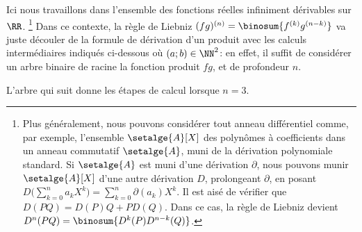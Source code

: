 Ici nous travaillons dans l'ensemble des fonctions réelles infiniment dérivables sur $\RR$.%
\footnote{
	Plus généralement, nous pouvons considérer tout anneau différentiel comme, par exemple, l'ensemble $\setalge{A}[X]$ des polynômes à coefficients dans un anneau commutatif $\setalge{A}$, muni de la dérivation polynomiale standard.
	Si $\setalge{A}$ est muni d'une dérivation $\partial$,
	nous pouvons munir $\setalge{A}[X]$ d'une autre dérivation $D$, prolongeant $\partial$, en posant
	$D \big( \sum_{k=0}^n a_k X^k \big) = \sum_{k=0}^n \partial(a_k) X^k$.
	Il est aisé de vérifier que $D(PQ) = D(P) Q + P D(Q)$.
	Dans ce cas, la règle de Liebniz devient $D^n(PQ) = \binosum{D^k(P) D^{n-k}(Q)}$.
}
Dans ce contexte,
la règle de Liebniz $(fg)^{(n)} = \binosum{f^{(k)} g^{(n-k)}}$ va juste découler de la formule de dérivation d'un produit avec les calculs intermédiaires indiqués ci-dessous où $(a;b) \in \NN^2$:
en effet,
il suffit de considérer un arbre binaire de racine la fonction produit $f g$, et de profondeur $n$.

%
            {\intertree}{\prodder}


L'arbre qui suit donne les étapes de calcul lorsque $n=3$.

\binotree{\prodder}


